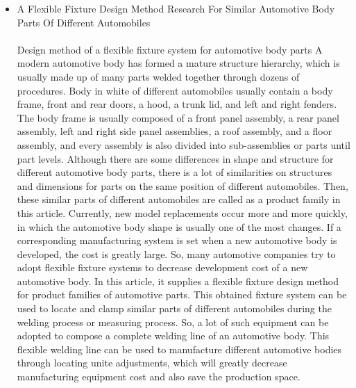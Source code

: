 \documentclass[16pt,a4paper]{article}
\begin{document}
\begin{itemize}
\item A Flexible Fixture Design Method Research For Similar Automotive Body Parts Of Different Automobiles\\  
\\ Design method of a flexible fixture system for automotive body parts A modern automotive body has formed a mature structure hierarchy, which is usually made up of many parts welded together through dozens of procedures. Body in white of different automobiles usually contain a body frame, front and rear doors, a hood, a trunk lid, and left and right fenders. The body frame is usually composed of a front panel assembly, a rear panel assembly, left and right side panel assemblies, a roof assembly, and a floor assembly, and every assembly is also divided into sub-assemblies or parts until part levels. Although there are some differences in shape and structure for different automotive body parts, there is a lot of similarities on structures and dimensions for parts on the same position of different automobiles. Then, these similar parts of different automobiles are called as a product family in this article. Currently, new model replacements occur more and more quickly, in which the automotive body shape is usually one of the most changes. If a corresponding manufacturing system is set when a new automotive body is developed, the cost is greatly large. So, many automotive companies try to adopt flexible fixture systems to decrease development cost of a new automotive body. In this article, it supplies a flexible fixture design method for product families of automotive parts. This obtained fixture system can be used to locate and clamp similar parts of different automobiles during the welding process or measuring process. So, a lot of such equipment can be adopted to compose a complete welding line of an automotive body. This flexible welding line can be used to manufacture different automotive bodies through locating unite adjustments, which will greatly decrease manufacturing equipment cost and also save the production space.\\    


\end{itemize}
\end{document}
